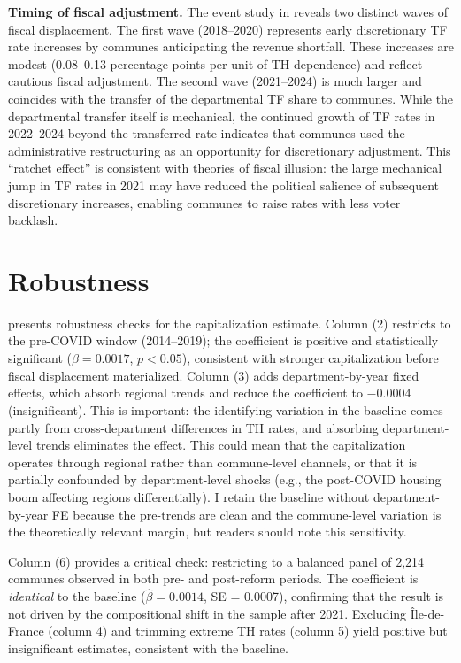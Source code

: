 \documentclass[12pt]{article}
\begin{document}
\textbf{Timing of fiscal adjustment.} The event study in  reveals two distinct waves of fiscal displacement. The first wave (2018--2020) represents early discretionary TF rate increases by communes anticipating the revenue shortfall. These increases are modest (0.08--0.13 percentage points per unit of TH dependence) and reflect cautious fiscal adjustment. The second wave (2021--2024) is much larger and coincides with the transfer of the departmental TF share to communes. While the departmental transfer itself is mechanical, the continued growth of TF rates in 2022--2024 beyond the transferred rate indicates that communes used the administrative restructuring as an opportunity for discretionary adjustment. This ``ratchet effect'' is consistent with theories of fiscal illusion: the large mechanical jump in TF rates in 2021 may have reduced the political salience of subsequent discretionary increases, enabling communes to raise rates with less voter backlash.


\section{Robustness}

 presents robustness checks for the capitalization estimate. Column (2) restricts to the pre-COVID window (2014--2019); the coefficient is positive and statistically significant ($\hat\beta = 0.0017$, $p < 0.05$), consistent with stronger capitalization before fiscal displacement materialized. Column (3) adds department-by-year fixed effects, which absorb regional trends and reduce the coefficient to $-0.0004$ (insignificant). This is important: the identifying variation in the baseline comes partly from cross-department differences in TH rates, and absorbing department-level trends eliminates the effect. This could mean that the capitalization operates through regional rather than commune-level channels, or that it is partially confounded by department-level shocks (e.g., the post-COVID housing boom affecting regions differentially). I retain the baseline without department-by-year FE because the pre-trends are clean and the commune-level variation is the theoretically relevant margin, but readers should note this sensitivity.

Column (6) provides a critical check: restricting to a balanced panel of 2,214 communes observed in both pre- and post-reform periods. The coefficient is \emph{identical} to the baseline ($\hat\beta = 0.0014$, SE = 0.0007), confirming that the result is not driven by the compositional shift in the sample after 2021. Excluding \^Ile-de-France (column 4) and trimming extreme TH rates (column 5) yield positive but insignificant estimates, consistent with the baseline.
\end{document}
